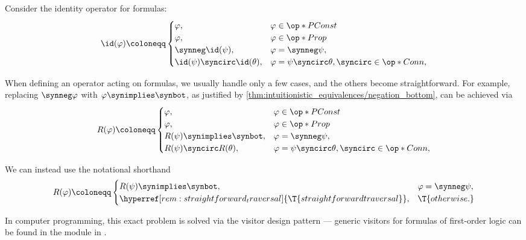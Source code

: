 \begin{remark}\label{rem:straightforward_traversal}
  Consider the identity operator for formulas:
  \begin{equation*}
    \begin{aligned}
      \id(\varphi) \coloneqq \begin{cases}
        \varphi,                        &\varphi \in \op*{PConst} \\
        \varphi,                        &\varphi \in \op*{Prop} \\
        \synneg \id(\psi),              &\varphi = \synneg \psi, \\
        \id(\psi) \syncirc \id(\theta), &\varphi = \psi \syncirc \theta, {\syncirc} \in \op*{Conn}, \\
      \end{cases}
    \end{aligned}
  \end{equation*}

  When defining an operator acting on formulas, we usually handle only a few cases, and the others become straightforward. For example, replacing \( \synneg \varphi \) with \( \varphi \synimplies \synbot \), as justified by \cref{thm:intuitionistic_equivalences/negation_bottom}, can be achieved via
  \begin{equation*}
    \begin{aligned}
      R(\varphi) \coloneqq \begin{cases}
        \varphi,                     &\varphi \in \op*{PConst} \\
        \varphi,                     &\varphi \in \op*{Prop} \\
        R(\psi) \synimplies \synbot, &\varphi = \synneg \psi, \\
        R(\psi) \syncirc R(\theta),  &\varphi = \psi \syncirc \theta, {\syncirc} \in \op*{Conn}, \\
      \end{cases}
    \end{aligned}
  \end{equation*}

  We can instead use the notational shorthand
  \begin{equation*}
    \begin{aligned}
      R(\varphi) \coloneqq \begin{cases}
        R(\psi) \synimplies \synbot,                                             &\varphi = \synneg \psi, \\
        \hyperref[rem:straightforward_traversal]{\T{straightforward traversal}}, &\T{otherwise.}
      \end{cases}
    \end{aligned}
  \end{equation*}

  In computer programming, this exact problem is solved via the visitor design pattern --- generic visitors for formulas of first-order logic can be found in the module  in \cite{notebook:code}.
\end{remark}

